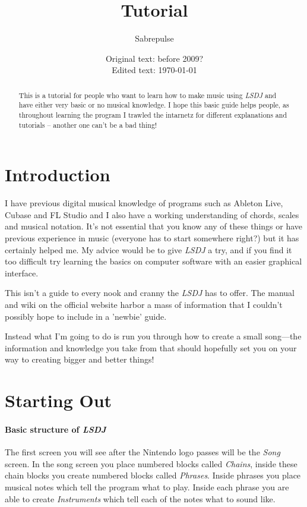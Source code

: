 \documentclass[]{article}
\title{\lsdj Tutorial}
\author{Sabrepulse}
\date{Original text: before 2009? \\ Edited text: \today}
\newcommand{\lsdj}{\textit{LSDJ}\xspace}
\begin{document}
\maketitle

\begin{abstract}
This is a tutorial for people who want to learn how to make music using \lsdj and have either very basic or no musical knowledge. I hope this basic guide helps people, as throughout learning the program I trawled the intarnetz for different explanations and tutorials – another one can't be a bad thing!
\end{abstract}


\tableofcontents

\section{Introduction}



I have previous digital musical knowledge of programs such as Ableton Live, Cubase and FL Studio and I also have a working understanding of chords, scales and musical notation. It's not essential that you know any of these things or have previous experience in music (everyone has to start somewhere right?) but it has certainly helped me. My advice would be to give \lsdj a try, and if you find it too difficult try learning the basics on computer software with an easier graphical interface.

This isn't a guide to every nook and cranny the \lsdj has to offer. The manual and wiki on the official website harbor a mass of information that I couldn't possibly hope to include in a 'newbie' guide.

Instead what I'm going to do is run you through how to create a small song---the information and knowledge you take from that should hopefully set you on your way to creating bigger and better things!

\section{Starting Out}



\paragraph{Basic structure of \lsdj}

The first screen you will see after the Nintendo logo passes will be the \textit{Song} screen.
%
In the song screen you place numbered blocks called \textit{Chains}, inside these chain blocks you create numbered blocks called \textit{Phrases}. Inside phrases you place musical notes which tell the program what to play. Inside each phrase you are able to create \textit{Instruments} which tell each of the notes what to sound like.
\end{document}
